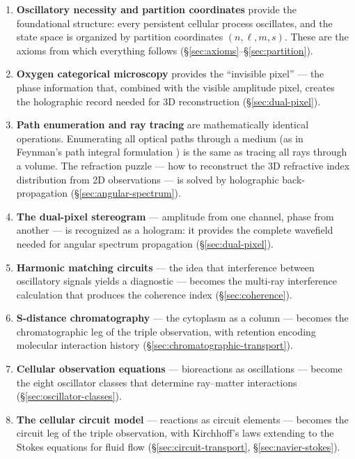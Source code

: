 \documentclass[11pt,twocolumn,a4paper]{article}
\begin{document}
\begin{enumerate}[leftmargin=*,itemsep=2pt]
\item \textbf{Oscillatory necessity and partition coordinates}
  provide the foundational structure: every persistent cellular process
  oscillates, and the state space is organized by partition coordinates
  $(n,\ell,m,s)$. These are the axioms from which everything follows
  (\S\ref{sec:axioms}--\S\ref{sec:partition}).

\item \textbf{Oxygen categorical microscopy} provides the ``invisible
  pixel'' --- the phase information that, combined with the visible
  amplitude pixel, creates the holographic record needed for 3D
  reconstruction (\S\ref{sec:dual-pixel}).

\item \textbf{Path enumeration and ray tracing} are mathematically
  identical operations. Enumerating all optical paths through a medium
  (as in Feynman's path integral formulation \citep{sakurai2017}) is
  the same as tracing all rays through a volume. The refraction puzzle
  --- how to reconstruct the 3D refractive index distribution from 2D
  observations --- is solved by holographic back-propagation
  (\S\ref{sec:angular-spectrum}).

\item \textbf{The dual-pixel stereogram} --- amplitude from one
  channel, phase from another --- is recognized as a hologram:
  it provides the complete wavefield needed for angular spectrum
  propagation (\S\ref{sec:dual-pixel}).

\item \textbf{Harmonic matching circuits} --- the idea that
  interference between oscillatory signals yields a diagnostic ---
  becomes the multi-ray interference calculation that produces the
  coherence index (\S\ref{sec:coherence}).

\item \textbf{S-distance chromatography} --- the cytoplasm as a
  column --- becomes the chromatographic leg of the triple observation,
  with retention encoding molecular interaction history
  (\S\ref{sec:chromatographic-transport}).

\item \textbf{Cellular observation equations} --- bioreactions as
  oscillations --- become the eight oscillator classes that determine
  ray--matter interactions
  (\S\ref{sec:oscillator-classes}).

\item \textbf{The cellular circuit model} --- reactions as circuit
  elements --- becomes the circuit leg of the triple observation,
  with Kirchhoff's laws extending to the Stokes equations for fluid
  flow (\S\ref{sec:circuit-transport}, \S\ref{sec:navier-stokes}).


\end{enumerate}
\end{document}
